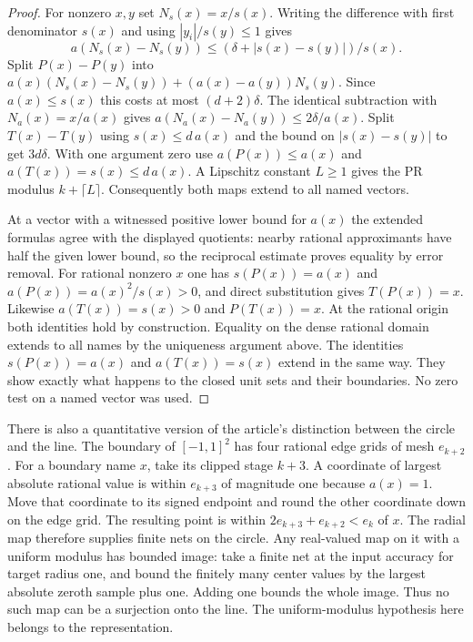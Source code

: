\begin{proof}
For nonzero $x,y$ set $N_s(x)=x/s(x)$. Writing the difference with first
denominator $s(x)$ and using $|y_i|/s(y)\le1$ gives
\[
 a(N_s(x)-N_s(y))\le(\delta+|s(x)-s(y)|)/s(x).
\]
Split $P(x)-P(y)$ into
$a(x)(N_s(x)-N_s(y))+(a(x)-a(y))N_s(y)$. Since $a(x)\le s(x)$ this
costs at most $(d+2)\delta$. The identical subtraction with
$N_a(x)=x/a(x)$ gives $a(N_a(x)-N_a(y))\le2\delta/a(x)$.
Split $T(x)-T(y)$ using $s(x)\le d\,a(x)$ and the bound on
$|s(x)-s(y)|$ to get $3d\delta$. With one argument zero use
$a(P(x))\le a(x)$ and $a(T(x))=s(x)\le d\,a(x)$.
A Lipschitz constant $L\ge1$ gives the PR modulus $k+\lceil L\rceil$.
Consequently both maps extend to all named vectors.

At a vector with a witnessed positive lower bound for $a(x)$ the extended
formulas agree with the displayed quotients: nearby rational approximants
have half the given lower bound, so the reciprocal estimate proves equality
by error removal. For rational nonzero $x$ one has $s(P(x))=a(x)$ and
$a(P(x))=a(x)^2/s(x)>0$, and direct substitution gives $T(P(x))=x$.
Likewise $a(T(x))=s(x)>0$ and $P(T(x))=x$. At the rational origin both
identities hold by construction. Equality on the dense rational domain
extends to all names by the uniqueness argument above. The identities
$s(P(x))=a(x)$ and $a(T(x))=s(x)$ extend in the same way. They show
exactly what happens to the closed unit sets and their boundaries.
No zero test on a named vector was used.
\end{proof}

There is also a quantitative version of the article's distinction between
the circle and the line. The boundary of $[-1,1]^2$ has four rational
edge grids of mesh $e_{k+2}$. For a boundary name $x$, take its clipped
stage $k+3$. A coordinate of largest absolute rational value is within
$e_{k+3}$ of magnitude one because $a(x)=1$. Move that coordinate to its
signed endpoint and round the other coordinate down on the edge grid.
The resulting point is within $2e_{k+3}+e_{k+2}<e_k$ of $x$.
The radial map therefore supplies finite nets on the circle. Any real-valued
map on it with a uniform modulus has bounded image: take a finite net at
the input accuracy for target radius one, and bound the finitely many center
values by the largest absolute zeroth sample plus one. Adding one bounds
the whole image. Thus no such map can be a surjection onto the line.
The uniform-modulus hypothesis here belongs to the representation.


